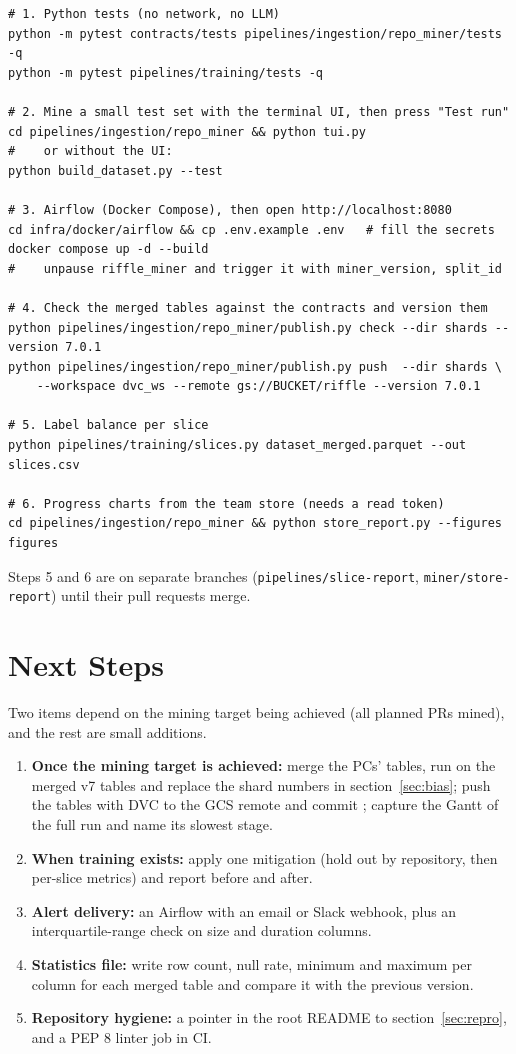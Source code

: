 \documentclass[11pt,a4paper]{article}
\newcommand{\code}[1]{\texttt{\detokenize{#1}}}
\begin{document}
\begin{verbatim}
# 1. Python tests (no network, no LLM)
python -m pytest contracts/tests pipelines/ingestion/repo_miner/tests -q
python -m pytest pipelines/training/tests -q

# 2. Mine a small test set with the terminal UI, then press "Test run"
cd pipelines/ingestion/repo_miner && python tui.py
#    or without the UI:
python build_dataset.py --test

# 3. Airflow (Docker Compose), then open http://localhost:8080
cd infra/docker/airflow && cp .env.example .env   # fill the secrets
docker compose up -d --build
#    unpause riffle_miner and trigger it with miner_version, split_id

# 4. Check the merged tables against the contracts and version them
python pipelines/ingestion/repo_miner/publish.py check --dir shards --version 7.0.1
python pipelines/ingestion/repo_miner/publish.py push  --dir shards \
    --workspace dvc_ws --remote gs://BUCKET/riffle --version 7.0.1

# 5. Label balance per slice
python pipelines/training/slices.py dataset_merged.parquet --out slices.csv

# 6. Progress charts from the team store (needs a read token)
cd pipelines/ingestion/repo_miner && python store_report.py --figures figures
\end{verbatim}

Steps 5 and 6 are on separate branches (\texttt{pipelines/slice-report}, \texttt{miner/store-report}) until their pull requests merge.

\section{Next Steps}
Two items depend on the mining target being achieved (all planned PRs mined), and the rest are small additions.
\begin{enumerate}
  \item \textbf{Once the mining target is achieved:} merge the PCs' tables, run \code{slices.py} on the merged v7 tables and replace the shard numbers in section~\ref{sec:bias}; push the tables with DVC to the GCS remote and commit \code{data/mined.dvc}; capture the Gantt of the full run and name its slowest stage.
  \item \textbf{When training exists:} apply one mitigation (hold out by repository, then per-slice metrics) and report before and after.
  \item \textbf{Alert delivery:} an Airflow \code{on_failure_callback} with an email or Slack webhook, plus an interquartile-range check on size and duration columns.
  \item \textbf{Statistics file:} write row count, null rate, minimum and maximum per column for each merged table and compare it with the previous version.
  \item \textbf{Repository hygiene:} a pointer in the root README to section~\ref{sec:repro}, and a PEP 8 linter job in CI.
\end{enumerate}
\end{document}
